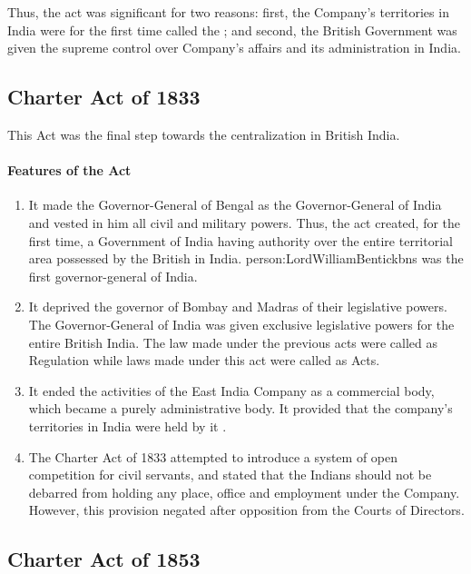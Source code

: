 Thus, the act was significant for two reasons: first, the Company's territories in India were for the first time called the ; and second, the British Government was given the supreme control over Company's affairs and its administration in India.

\subsection{Charter Act of 1833}

This Act was the final step towards the centralization in British India.

\paragraph{Features of the Act}
\begin{enumerate}
  \item It made the Governor-General of Bengal as the Governor-General of India and vested in him all civil and military powers. Thus, the act created, for the first time, a Government of India having authority over the entire territorial area possessed by the British in India. \gls{person:LordWilliamBentickbns} was the first governor-general of India.
  \item It deprived the governor of Bombay and Madras of their legislative powers. The Governor-General of India was given exclusive legislative powers for the entire British India. The law made under the previous acts were called as Regulation while laws made under this act were called as Acts.
  \item It ended the activities of the East India Company as a commercial body, which became a purely administrative body. It provided that the company's territories in India were held by it .
  \item The Charter Act of 1833 attempted to introduce a system of open competition for civil servants, and stated that the Indians should not be debarred from holding any place, office and employment under the Company. However, this provision negated after opposition from the Courts of Directors.
\end{enumerate}

\subsection{Charter Act of 1853}

